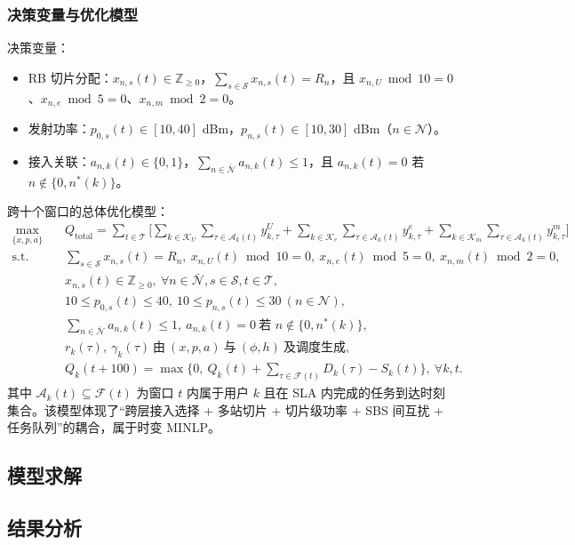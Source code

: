\subsubsection{决策变量与优化模型}

决策变量：
\begin{itemize}
  \item RB 切片分配：$x_{n,s}(t)\in\mathbb{Z}_{\ge 0}$，$\sum\limits_{s\in\mathcal{S}} x_{n,s}(t)=R_n$，且 $x_{n,U}\bmod 10=0$、$x_{n,e}\bmod 5=0$、$x_{n,m}\bmod 2=0$。
  \item 发射功率：$p_{0,s}(t)\in[10,40]$ dBm，$p_{n,s}(t)\in[10,30]$ dBm（$n\in\mathcal{N}$）。
  \item 接入关联：$a_{n,k}(t)\in\{0,1\}$，$\sum\limits_{n\in\bar{\mathcal{N}}} a_{n,k}(t)\le 1$，且 $a_{n,k}(t)=0$ 若 $n\notin\{0,n^*(k)\}$。
\end{itemize}

跨十个窗口的总体优化模型：
\begin{equation}
\begin{aligned}
\max\limits_{\{x,p,a\}}\quad & Q_{\text{total}}=\sum_{t\in\mathcal{T}}\Bigg[\sum_{k\in\mathcal{K}_U}\sum_{\tau\in\mathcal{A}_k(t)} y^{U}_{k,\tau}+\sum_{k\in\mathcal{K}_e}\sum_{\tau\in\mathcal{A}_k(t)} y^{e}_{k,\tau}+\sum_{k\in\mathcal{K}_m}\sum_{\tau\in\mathcal{A}_k(t)} y^{m}_{k,\tau}\Bigg] \\
\text{s.t.}\quad & \sum_{s\in\mathcal{S}} x_{n,s}(t)=R_n,\ x_{n,U}(t)\bmod 10=0,\ x_{n,e}(t)\bmod 5=0,\ x_{n,m}(t)\bmod 2=0,\\
& x_{n,s}(t)\in\mathbb{Z}_{\ge 0},\ \forall n\in\bar{\mathcal{N}},s\in\mathcal{S},t\in\mathcal{T},\\
& 10\le p_{0,s}(t)\le 40,\ 10\le p_{n,s}(t)\le 30\ (n\in\mathcal{N}),\\
& \sum_{n\in\bar{\mathcal{N}}} a_{n,k}(t)\le 1,\ a_{n,k}(t)=0\ \text{若 }n\notin\{0,n^*(k)\},\\
& r_k(\tau),\ \gamma_k(\tau)\ \text{由}\ (x,p,a)\ \text{与}\ (\phi,h)\ \text{及调度生成},\\
& Q_k(t+100)=\max\Big\{0,\ Q_k(t)+\sum_{\tau\in\mathcal{F}(t)} D_k(\tau)-S_k(t)\Big\},\ \forall k,t.
\end{aligned}
\end{equation}
其中 $\mathcal{A}_k(t)\subseteq\mathcal{F}(t)$ 为窗口 $t$ 内属于用户 $k$ 且在 SLA 内完成的任务到达时刻集合。该模型体现了“跨层接入选择 + 多站切片 + 切片级功率 + SBS 间互扰 + 任务队列”的耦合，属于时变 MINLP。

\subsection{模型求解}


\subsection{结果分析}
